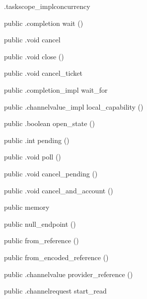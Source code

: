\begin{CrexxClass}{.taskscope\_impl}{concurrency}
\begin{Members}
    \Method
      {public}
      {.completion}
      {wait}
      {()}

    \Method
      {public}
      {.void}
      {cancel}
      {}

    \Method
      {public}
      {.void}
      {close}
      {()}

    \Method
      {public}
      {.void}
      {cancel\_ticket}
      {}

    \Method
      {public}
      {.completion\_impl}
      {wait\_for}
      {}

    \Method
      {public}
      {.channelvalue\_impl}
      {local\_capability}
      {()}

    \Method
      {public}
      {.boolean}
      {open\_state}
      {()}

    \Method
      {public}
      {.int}
      {pending}
      {()}

    \Method
      {public}
      {.void}
      {poll}
      {()}

    \Method
      {public}
      {.void}
      {cancel\_pending}
      {()}

    \Method
      {public}
      {.void}
      {cancel\_and\_account}
      {()}

    \Factory
      {public}
      {memory}
      {}

    \Factory
      {public}
      {null\_endpoint}
      {()}

    \Factory
      {public}
      {from\_reference}
      {()}

    \Factory
      {public}
      {from\_encoded\_reference}
      {()}

    \Method
      {public}
      {.channelvalue}
      {provider\_reference}
      {()}

    \Method
      {public}
      {.channelrequest}
      {start\_read}
      {}


\end{Members}
\end{CrexxClass}
